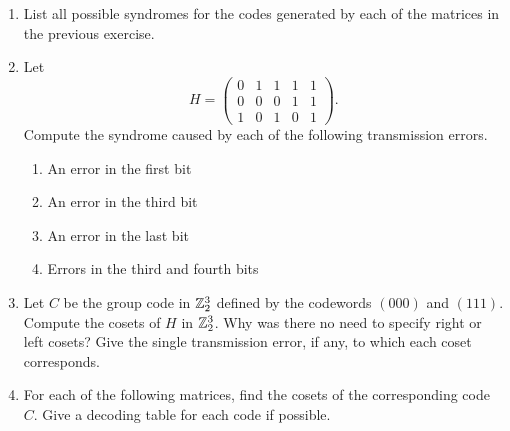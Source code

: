 {\begin{enumerate}
\begin{minipage}[t]{4.6in}
\begin{minipage}[t]{2.25in}
\begin{itemize}
 \item[{\bf (d)}]
 
\end{itemize}
\end{minipage}
\end{minipage}
 
\vspace{4pt}        %
 
 
\bf\item\rm %
List all possible syndromes for the codes generated by each of the
matrices in the previous exercise. 
 
 
\bf\item\rm
Let
\[
H =
\left(
\begin{array}{ccccc}
0 & 1 & 1 & 1 & 1 \\
0 & 0 & 0 & 1 & 1 \\
1 & 0 & 1 & 0 & 1
\end{array}
\right).
\]
Compute the syndrome caused by each of the following transmission
errors. 
\begin{enumerate}
 
 \bf\item\rm 
An error in the first bit
 
 \bf\item\rm 
An error in the third bit
 
 \bf\item\rm 
An error in the last bit
 
 \bf\item\rm 
Errors in the third and fourth bits
 
\end{enumerate}
 
 
\bf\item\rm
Let $C$ be the group code in ${\Bbb Z}_2^3$ defined by the codewords
$(000)$ and $(111)$. Compute the cosets of $H$ in ${\Bbb Z}_2^3$. Why
was there no need to specify right or left cosets? Give the
single transmission error, if any, to which each coset corresponds.
 
 
\bf\item\rm
For each of the following matrices, find the cosets of the
corresponding code $C$. Give a decoding table for each code if
possible. 
 

\end{enumerate}}
